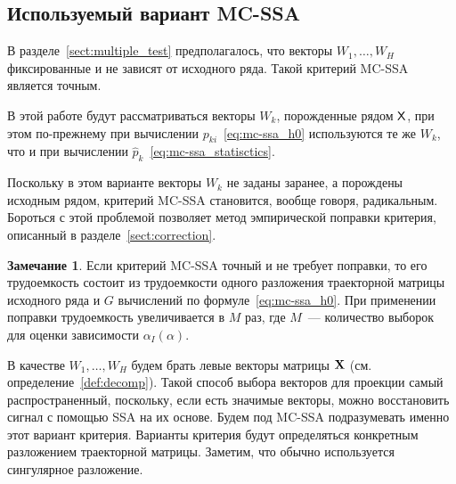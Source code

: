 \documentclass[specialist,
substylefile = spbu_report.rtx,
subf,href,colorlinks=true, 12pt]{disser}
\theoremstyle{definition}
\newtheorem{remark}{Замечание}
\begin{document}
\subsection{Используемый вариант MC-SSA}\label{sect:vectors_choise}

В разделе~\ref{sect:multiple_test} предполагалось, что векторы $W_1,\ldots, W_H$ фиксированные и не зависят от исходного ряда. Такой критерий MC-SSA является точным.

В этой работе будут рассматриваться векторы $W_k$, порожденные рядом $\mathsf{X}$, при этом по-прежнему при вычислении $p_{ki}$~\eqref{eq:mc-ssa_h0} используются те же $W_k$, что и при вычислении $\widehat p_k$~\eqref{eq:mc-ssa_statisctics}. 

Поскольку в этом варианте векторы $W_k$ не заданы заранее, а порождены исходным рядом, критерий MC-SSA становится, вообще говоря, радикальным. Бороться с этой проблемой позволяет метод эмпирической поправки критерия, описанный в разделе~\ref{sect:correction}.

\begin{remark}\label{remark:complexity}
	Если критерий MC-SSA точный и не требует поправки, то его трудоемкость состоит из трудоемкости одного разложения траекторной матрицы исходного ряда и $G$ вычислений по формуле~\eqref{eq:mc-ssa_h0}. При применении поправки трудоемкость увеличивается в $M$ раз, где $M$~--- количество выборок для оценки зависимости $\alpha_I(\alpha)$.
\end{remark}


В качестве $W_1, \ldots,W_H$ будем брать левые векторы матрицы $\mathbf{X}$ (см. определение~\ref{def:decomp}). Такой способ выбора векторов для проекции самый распространенный, поскольку, если есть значимые векторы, можно восстановить сигнал с помощью SSA на их основе. Будем под MC-SSA подразумевать именно этот вариант критерия. Варианты критерия будут определяться конкретным разложением траекторной матрицы. Заметим, что обычно используется сингулярное разложение.
\end{document}
